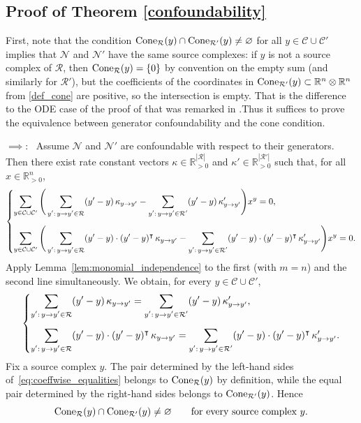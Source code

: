 \documentclass[10pt,a4paper]{amsart}
\let\emptyset\varnothing
\theoremstyle{definition}
\theoremstyle{remark}
\theoremstyle{consequence}
\def\cN{\mathcal{N}}
\def\cR{\mathcal{R}}
\def\cC{\mathcal{C}}
\def\R{\mathbb{R}}
\numberwithin{equation}{section}
\begin{document}
\subsection{Proof of Theorem \ref{confoundability}}\label{prf_confoundability}
{
First, note that the condition ${\rm Cone}_{\cR}(y)\cap {\rm Cone}_{\cR'}(y)\neq\emptyset$ for all $y\in \cC\cup\cC'$ implies that $\cN$ and $\cN'$ have the same source complexes: if $y$ is not a source complex of $\cR$, then ${\rm Cone}_{\cR}(y)=\{0\}$ by convention on the empty sum (and similarly for $\cR'$), but the coefficients of the coordinates in ${\rm Cone}_{\cR'}(y)\subset\R^n \otimes \R^n$ from \eqref{def_cone} are positive, so the intersection is empty. That is the difference to the ODE case of the proof of \cite[Theorem 4.4]{ident_CRNs} that was remarked in \cite{szederkenyi2009comment}.Thus it suffices to prove the equivalence between generator confoundability and the cone condition.

\medskip
 $\implies$:~
Assume $\cN$ and $\cN'$ are confoundable with respect to their generators. Then there exist rate constant vectors $\kappa\in\mathbb R^{|\cR|}_{>0}$ and $\kappa'\in\mathbb R^{|\cR'|}_{>0}$ such that, for all $x\in\mathbb R^n_{>0}$,
\begin{equation}\label{eq:gen_conf_poly}
\begin{dcases}
\displaystyle
\sum_{y\in \cC\cup\cC'}
\Bigg(
\sum_{\substack{y':\,y\to y'\in\cR}} (y'-y)\,\kappa_{y\to y'}
-
\sum_{\substack{y':\,y\to y'\in\cR'}} (y'-y)\,\kappa'_{y\to y'}
\Bigg)x^y = 0,\\[1.2ex]
\displaystyle
\sum_{y\in \cC\cup\cC'}
\Bigg(
\sum_{\substack{y':\,y\to y'\in\cR}} (y'-y)\cdot(y'-y)^{\intercal}\,\kappa_{y\to y'}
-
\sum_{\substack{y':\,y\to y'\in\cR'}} (y'-y)\cdot(y'-y)^{\intercal}\,\kappa'_{y\to y'}
\Bigg)x^y = 0.
\end{dcases}
\end{equation}
Apply Lemma~\ref{lem:monomial_independence} to the first (with $m=n$) and the second line simultaneously. We obtain, for every $y\in \cC\cup\cC'$,
\begin{equation}\label{eq:coeffwise_equalities}
\begin{dcases}
\displaystyle
\sum_{\substack{y':\,y\to y'\in\cR}} (y'-y)\,\kappa_{y\to y'}
=
\sum_{\substack{y':\,y\to y'\in\cR'}} (y'-y)\,\kappa'_{y\to y'},\\[1.2ex]
\displaystyle
\sum_{\substack{y':\,y\to y'\in\cR}} (y'-y)\cdot(y'-y)^{\intercal}\,\kappa_{y\to y'}
=
\sum_{\substack{y':\,y\to y'\in\cR'}} (y'-y)\cdot(y'-y)^{\intercal}\,\kappa'_{y\to y'}.
\end{dcases}
\end{equation}
Fix a source complex $y$. The pair determined by the left-hand sides of~\eqref{eq:coeffwise_equalities} belongs to ${\rm Cone}_{\cR}(y)$ by definition, while the equal pair determined by the right-hand sides belongs to ${\rm Cone}_{\cR'}(y)$. Hence
\[
{\rm Cone}_{\cR}(y)\cap {\rm Cone}_{\cR'}(y)\neq \emptyset
\qquad \text{for every source complex } y.
\]

}
\end{document}
